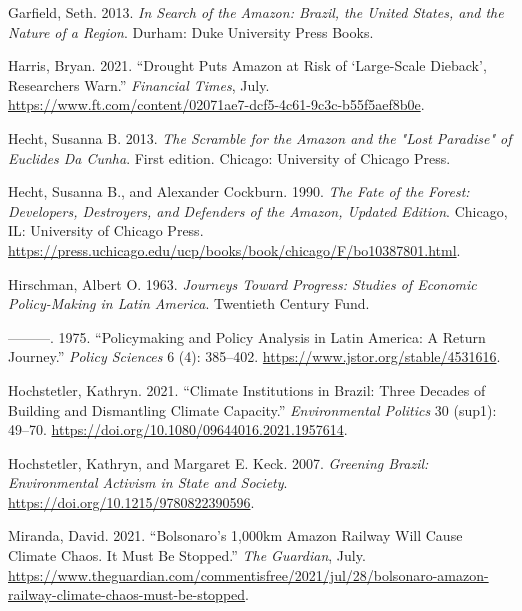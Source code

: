 \documentclass[
]{article}
\newlength{\cslhangindent}
\newlength{\cslentryspacingunit} %
\newenvironment{CSLReferences}[2] %
 {%
  \setlength{\parindent}{0pt}
  \ifodd #1
  \let\oldpar\par
  \def\par{\hangindent=\cslhangindent\oldpar}
  \fi
  \setlength{\parskip}{#2\cslentryspacingunit}
 }%
 {}
\begin{document}
\begin{CSLReferences}{1}{0}
\leavevmode{}%
Garfield, Seth. 2013. \emph{In Search of the Amazon: Brazil, the United
States, and the Nature of a Region}. Durham: Duke University Press
Books.

\leavevmode{}%
Harris, Bryan. 2021. {``Drought Puts Amazon at Risk of {`}Large-Scale
Dieback{'}, Researchers Warn.''} \emph{Financial Times}, July.
\url{https://www.ft.com/content/02071ae7-dcf5-4c61-9c3c-b55f5aef8b0e}.

\leavevmode{}%
Hecht, Susanna B. 2013. \emph{The Scramble for the Amazon and the
{"}Lost Paradise{"} of Euclides Da Cunha}. First edition. Chicago:
University of Chicago Press.

\leavevmode{}%
Hecht, Susanna B., and Alexander Cockburn. 1990. \emph{The Fate of the
Forest: Developers, Destroyers, and Defenders of the Amazon, Updated
Edition}. Chicago, IL: University of Chicago Press.
\url{https://press.uchicago.edu/ucp/books/book/chicago/F/bo10387801.html}.

\leavevmode{}%
Hirschman, Albert O. 1963. \emph{Journeys Toward Progress: Studies of
Economic Policy-Making in Latin America}. Twentieth Century Fund.

\leavevmode{}%
---------. 1975. {``Policymaking and Policy Analysis in Latin America: A
Return Journey.''} \emph{Policy Sciences} 6 (4): 385--402.
\url{https://www.jstor.org/stable/4531616}.

\leavevmode{}%
Hochstetler, Kathryn. 2021. {``Climate Institutions in Brazil: Three
Decades of Building and Dismantling Climate Capacity.''}
\emph{Environmental Politics} 30 (sup1): 49--70.
\url{https://doi.org/10.1080/09644016.2021.1957614}.

\leavevmode{}%
Hochstetler, Kathryn, and Margaret E. Keck. 2007. \emph{Greening Brazil:
Environmental Activism in State and Society}.
\url{https://doi.org/10.1215/9780822390596}.

\leavevmode{}%
Miranda, David. 2021. {``Bolsonaro{'}s 1,000km Amazon Railway Will Cause
Climate Chaos. It Must Be Stopped.''} \emph{The Guardian}, July.
\url{https://www.theguardian.com/commentisfree/2021/jul/28/bolsonaro-amazon-railway-climate-chaos-must-be-stopped}.


\end{CSLReferences}
\end{document}
